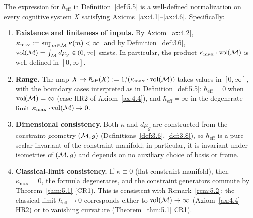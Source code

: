 \begin{proposition}
\label{prop:5.1.normalization}
The expression for $\hbar_{\mathrm{eff}}$ in
Definition~\textup{\ref{def:5.5}} is a well-defined normalization on
every cognitive system $X$ satisfying
Axioms~\textup{\ref{ax:4.1}}--\textup{\ref{ax:4.6}}.  Specifically:
\begin{enumerate}
  \item[\textup{(N1)}] \textbf{Existence and finiteness of inputs.}
    By Axiom~\textup{\ref{ax:4.2}},
    $\kappa_{\max} := \sup_{m\in\mathcal{M}}\kappa(m) < \infty$, and by
    Definition~\textup{\ref{def:3.6}}, $\mathrm{vol}(\mathcal{M}) =
    \int_{\mathcal{M}} d\mu_g \in (0, \infty]$ exists.  In particular,
    the product $\kappa_{\max}\cdot\mathrm{vol}(\mathcal{M})$ is well-defined
    in $[0, \infty]$.
  \item[\textup{(N2)}] \textbf{Range.} The map
    $X \mapsto \hbar_{\mathrm{eff}}(X) := 1 / (\kappa_{\max}\cdot
    \mathrm{vol}(\mathcal{M}))$ takes values in
    $[0, \infty]$, with the boundary cases interpreted as in
    Definition~\textup{\ref{def:5.5}}: $\hbar_{\mathrm{eff}} = 0$
    when $\mathrm{vol}(\mathcal{M}) = \infty$
    \textup{(}case HR2 of Axiom~\textup{\ref{ax:4.4}})\textup{,} and
    $\hbar_{\mathrm{eff}} = \infty$ in the degenerate limit
    $\kappa_{\max}\cdot\mathrm{vol}(\mathcal{M}) \to 0$.
  \item[\textup{(N3)}] \textbf{Dimensional consistency.}
    Both $\kappa$ and $d\mu_g$ are constructed from the constraint
    geometry $(\mathcal{M}, g)$ \textup{(}Definitions~\textup{\ref{def:3.6},
    \ref{def:3.8})}, so $\hbar_{\mathrm{eff}}$ is a pure scalar
    invariant of the constraint manifold; in particular, it is
    invariant under isometries of $(\mathcal{M}, g)$ and depends on no
    auxiliary choice of basis or frame.
  \item[\textup{(N4)}] \textbf{Classical-limit consistency.}
    If $\kappa \equiv 0$ \textup{(}flat constraint manifold\textup{)},
    then $\kappa_{\max} = 0$, the formula degenerates, and the
    constraint generators commute by Theorem~\textup{\ref{thm:5.1}}
    (CR1).  This is consistent with
    Remark~\textup{\ref{rem:5.2}}: the classical limit
    $\hbar_{\mathrm{eff}} \to 0$ corresponds either to
    $\mathrm{vol}(\mathcal{M}) \to \infty$ \textup{(}Axiom~\textup{\ref{ax:4.4}}
    HR2\textup{)} or to vanishing curvature
    \textup{(}Theorem~\textup{\ref{thm:5.1}} CR1\textup{)}.
\end{enumerate}
\end{proposition}

